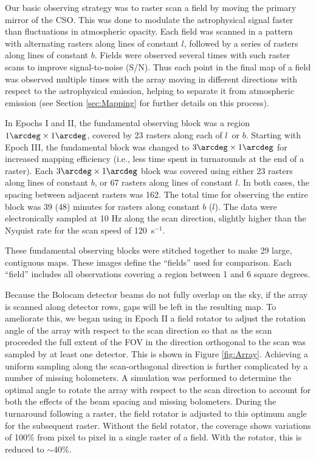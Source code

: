 \documentclass[12pt,preprint]{aastex}
\newcommand{\lon}{\ensuremath{l}}
\begin{document}
Our basic observing strategy was to raster scan a field by moving the
primary mirror of the CSO.  This was done to modulate the
astrophysical signal faster than fluctuations in atmospheric opacity.
Each field was scanned in a pattern with alternating rasters along
lines of constant $l$, followed by a series of rasters along lines of
constant $b$.  Fields were observed several times with such raster
scans to improve signal-to-noise (S/N).  Thus each point in the final
map of a field was observed multiple times with the array moving in
different directions with respect to the astrophysical emission,
helping to separate it from atmospheric emission (see Section
\ref{sec:Mapping} for further details on this process).

In Epochs I and II, the fundamental observing block was a region
$1\arcdeg \times 1\arcdeg$, covered by 23 rasters along each of \lon\
or $b$.  Starting with Epoch III, the fundamental block was changed to
$3\arcdeg \times 1\arcdeg$ for increased mapping efficiency (i.e.,
less time spent in turnarounds at the end of a raster).  Each
$3\arcdeg \times 1\arcdeg$ block was covered using either 23 rasters
along lines of constant $b$, or 67 rasters along lines of constant
$l$.  In both cases, the spacing between adjacent rasters was
162\arcsec.  The total time for observing the entire block was 39 (48)
minutes for rasters along constant $b$ ($l$).  The data were
electronically sampled at 10 Hz along the scan direction, slightly
higher than the Nyquist rate for the scan speed of 120\arcsec\
s$^{-1}$.

These fundamental observing blocks were stitched together to make 29
large, contiguous maps.  These images define the ``fields'' used for
comparison.  Each ``field'' includes all observations covering a
region between 1 and 6 square degrees.

Because the Bolocam detector beams do not fully overlap on the sky, if
the array is scanned along detector rows, gaps will be left in the
resulting map.  To ameliorate this, we began using in Epoch II a field
rotator to adjust the rotation angle of the array with respect to the
scan direction so that as the scan proceeded the full extent of the
FOV in the direction orthogonal to the scan was sampled by at least
one detector.  This is shown in Figure \ref{fig:Array}.  Achieving a
uniform sampling along the scan-orthogonal direction is further
complicated by a number of missing bolometers.  A simulation was
performed to determine the optimal angle to rotate the array with
respect to the scan direction to account for both the effects of the
beam spacing and missing bolometers.  During the turnaround following
a raster, the field rotator is adjusted to this optimum angle for the
subsequent raster.  Without the field rotator, the coverage shows
variations of 100\% from pixel to pixel in a single raster of a field.
With the rotator, this is reduced to $\sim40\%$.
\end{document}
